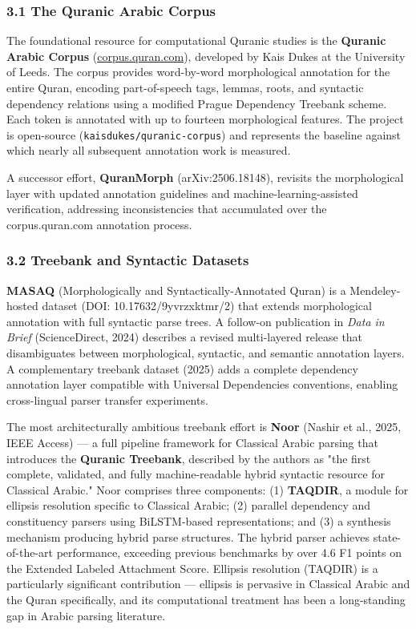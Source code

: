 \documentclass[12pt,a4paper]{article}
\begin{document}
\subsubsection{3.1 The Quranic Arabic Corpus}\label{s3-1}

The foundational resource for computational Quranic studies is the
\textbf{Quranic Arabic Corpus}
(\href{https://corpus.quran.com}{corpus.quran.com}), developed by Kais
Dukes at the University of Leeds. The corpus provides word-by-word
morphological annotation for the entire Quran, encoding part-of-speech
tags, lemmas, roots, and syntactic dependency relations using a modified
Prague Dependency Treebank scheme. Each token is annotated with up to
fourteen morphological features. The project is open-source
(\texttt{kaisdukes/quranic-corpus}) and represents the baseline against
which nearly all subsequent annotation work is measured.

A successor effort, \textbf{QuranMorph} (arXiv:2506.18148), revisits the
morphological layer with updated annotation guidelines and
machine-learning-assisted verification, addressing inconsistencies that
accumulated over the corpus.quran.com annotation process.

\subsubsection{3.2 Treebank and Syntactic Datasets}\label{s3-2}

\textbf{MASAQ} (Morphologically and Syntactically-Annotated Quran) is a
Mendeley-hosted dataset (DOI: 10.17632/9yvrzxktmr/2) that extends
morphological annotation with full syntactic parse trees. A follow-on
publication in \emph{Data in Brief} (ScienceDirect, 2024) describes a
revised multi-layered release that disambiguates between morphological,
syntactic, and semantic annotation layers. A complementary treebank
dataset (2025) adds a complete dependency annotation layer compatible
with Universal Dependencies conventions, enabling cross-lingual parser
transfer experiments.

The most architecturally ambitious treebank effort is \textbf{Noor}
(Nashir et al., 2025, IEEE Access) --- a full pipeline framework for
Classical Arabic parsing that introduces the \textbf{Quranic Treebank},
described by the authors as "the first complete, validated, and fully
machine-readable hybrid syntactic resource for Classical Arabic." Noor
comprises three components: (1) \textbf{TAQDIR}, a module for ellipsis
resolution specific to Classical Arabic; (2) parallel dependency and
constituency parsers using BiLSTM-based representations; and (3) a
synthesis mechanism producing hybrid parse structures. The hybrid parser
achieves state-of-the-art performance, exceeding previous benchmarks by
over 4.6 F1 points on the Extended Labeled Attachment Score. Ellipsis
resolution (TAQDIR) is a particularly significant contribution ---
ellipsis is pervasive in Classical Arabic and the Quran specifically,
and its computational treatment has been a long-standing gap in Arabic
parsing literature.
\end{document}
